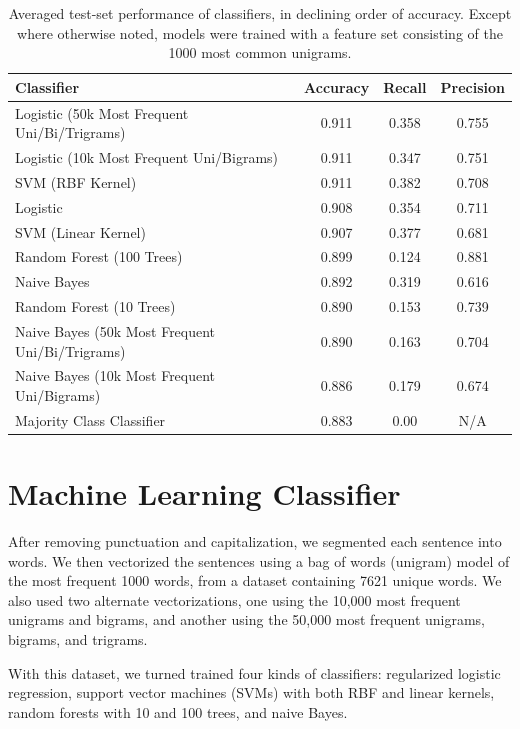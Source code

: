 \documentclass[11pt,letterpaper]{article}
\begin{document}
\begin{table}[t]
\centering
 \begin{tabular}{|l |c  c  c |} 
 \hline
\textbf{Classifier} & \textbf{Accuracy} & \textbf{Recall} & \textbf{Precision}\\
 \hline
Logistic (50k Most Frequent Uni/Bi/Trigrams) & 0.911 & 0.358 & 0.755\\
Logistic (10k Most Frequent Uni/Bigrams) & 0.911 & 0.347 & 0.751 \\
SVM (RBF Kernel) & 0.911 & 0.382 & 0.708 \\
Logistic & 0.908 & 0.354 & 0.711\\
SVM (Linear Kernel) & 0.907 & 0.377 & 0.681\\
Random Forest (100 Trees) & 0.899 & 0.124 & 0.881 \\
Naive Bayes & 0.892 & 0.319 & 0.616\\
Random Forest (10 Trees) & 0.890 & 0.153 & 0.739 \\
Naive Bayes (50k Most Frequent Uni/Bi/Trigrams) & 0.890 & 0.163 & 0.704\\
Naive Bayes (10k Most Frequent Uni/Bigrams) & 0.886 & 0.179 & 0.674 \\
Majority Class Classifier & 0.883 & 0.00 & N/A \\
 \hline
 \end{tabular}
 \caption{Averaged test-set performance of classifiers, in declining order of accuracy. Except where otherwise noted, models were trained with a feature set consisting of the 1000 most common unigrams.}
 \label{accuracies}
\end{table}
\section{Machine Learning Classifier}
\label{sec:mlclassifier}
After removing punctuation and capitalization, we segmented each sentence into words. We then vectorized the sentences using a bag of words (unigram) model of the most frequent 1000 words, from a dataset containing 7621 unique words. We also used two alternate vectorizations, one using the 10,000 most frequent unigrams and bigrams, and another using the 50,000 most frequent unigrams, bigrams, and trigrams. 

With this dataset, we turned trained four kinds of classifiers: regularized logistic regression, support vector machines (SVMs) with both RBF and linear kernels, random forests with 10 and 100 trees, and naive Bayes. 
\end{document}
